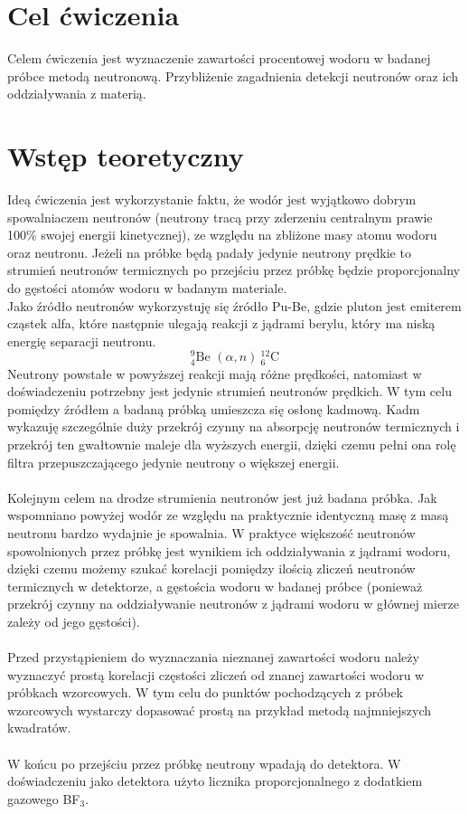 \documentclass{article}
\begin{document}
\section{Cel ćwiczenia}
Celem ćwiczenia jest wyznaczenie zawartości procentowej wodoru w badanej próbce metodą neutronową. Przybliżenie zagadnienia detekcji neutronów oraz ich oddziaływania z materią.
\section{Wstęp teoretyczny}
Ideą ćwiczenia jest wykorzystanie faktu, że wodór jest wyjątkowo dobrym spowalniaczem neutronów (neutrony tracą przy zderzeniu centralnym prawie 100\% swojej energii kinetycznej), ze względu na zbliżone masy atomu wodoru oraz neutronu. Jeżeli na próbke będą padały jedynie neutrony prędkie to strumień neutronów termicznych po przejściu przez próbkę będzie proporcjonalny do gęstości atomów wodoru w badanym materiale. \\

Jako źródło neutronów wykorzystuję się źródło Pu-Be, gdzie pluton jest emiterem cząstek alfa, 
które następnie ulegają reakcji z jądrami berylu, który ma niską energię separacji neutronu.\\
\[^9_4\text{Be }(\alpha,n)\ ^{12}_6\text{C}\]
Neutrony powstałe w powyższej reakcji mają różne prędkości, natomiast w doświadczeniu potrzebny jest jedynie strumień neutronów prędkich. W tym celu pomiędzy źródłem a badaną próbką umieszcza się osłonę kadmową. Kadm wykazuję szczególnie duży przekrój czynny na absorpcję neutronów termicznych i przekrój ten gwałtownie maleje dla wyższych energii, dzięki czemu pełni ona rolę filtra przepuszczającego jedynie neutrony o większej energii.\\\\
Kolejnym celem na drodze strumienia neutronów jest już badana próbka. Jak wspomniano powyżej wodór ze względu na praktycznie identyczną masę z masą neutronu bardzo wydajnie je spowalnia. W praktyce większość neutronów spowolnionych przez próbkę jest wynikiem ich oddziaływania z jądrami wodoru, dzięki czemu możemy szukać korelacji pomiędzy ilością zliczeń neutronów termicznych w detektorze, a gęstościa wodoru w badanej próbce (ponieważ przekrój czynny na oddziaływanie neutronów z jądrami wodoru w głównej mierze zależy od jego gęstości). \\\\
Przed przystąpieniem do wyznaczania nieznanej zawartości wodoru należy wyznaczyć prostą korelacji częstości zliczeń od znanej zawartości wodoru w próbkach wzorcowych. W tym celu do punktów pochodzących z próbek wzorcowych wystarczy dopasować prostą na przykład metodą najmniejszych kwadratów.\\\\
W końcu po przejściu przez próbkę neutrony wpadają do detektora. W doświadczeniu jako detektora użyto licznika proporcjonalnego z dodatkiem gazowego BF$_3$.
\end{document}

